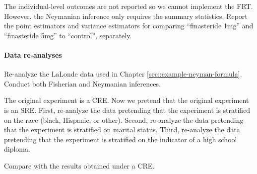 The individual-level outcomes are not reported so we cannot implement the FRT. However, the Neymanian inference only requires the summary statistics. Report the point estimators and variance estimators for comparing ``finasteride 1mg'' and ``finasteride 5mg'' to ``control'', separately. 


\paragraph{Data re-analyses}
 
 
Re-analyze the LaLonde data used in Chapter \ref{sec::example-neyman-formula}. Conduct both Fisherian and Neymanian inferences. 

The original experiment is a CRE. Now we pretend that the original experiment is an SRE.
First, re-analyze the data pretending that the experiment is stratified on the race (black, Hispanic, or other). Second, re-analyze the data pretending that the experiment is stratified on marital status. Third, re-analyze the data pretending that the experiment is stratified on the indicator of a high school diploma. 

Compare with the results obtained under a CRE. 

 
